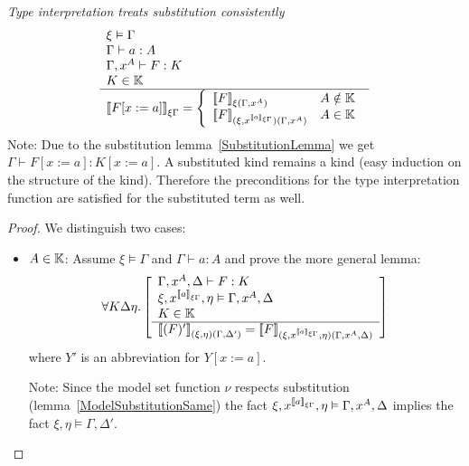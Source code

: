 \begin{theorem}
    \label{TypeInterpretationSubstitution}
    \emph{Type interpretation treats substitution consistently}
    $$
    \rulev{
        \xi \vDash \Gamma
        \\
        \Gamma \vdash a: A
        \\
        \Gamma,x^A \vdash F : K
        \\
        K \in \Kinds
    }
    {
        \typeinter{F[x:=a]}{\xi\Gamma}
        =
        \left\{
        \begin{array}{ll}
            \typeinter{F}{\xi(\Gamma,x^A)}
            &
            A \notin \Kinds
            \\
            \typeinter{F}{(\xi,x^{\typeinter{a}{\xi\Gamma}})(\Gamma,x^A)}
            &
            A \in \Kinds
        \end{array}
        \right.
    }
    $$
    Note: Due to the substitution lemma~\ref{SubstitutionLemma} we get $\Gamma
    \vdash F[x:=a] : K[x:=a]$. A substituted kind remains a kind (easy induction
    on the structure of the kind). Therefore the preconditions for the type
    interpretation function are satisfied for the substituted term as
    well.

    \begin{proof}
        \def\tintera{{\typeinter{a}{\xi\Gamma}}}

        We distinguish two cases:
        \begin{itemize}
        \def\subgoal#1#2#3#4{
            \typeinter{(#1)'}{(\xi,#4)(\Gamma,#3')}
            =
            \typeinter{#1}{(\xi,x^\tintera,#4)(\Gamma,x^A,#3)}
        }
        \def\goal#1#2#3#4{
            \ruleall{#2#3#4}
            {
                \Gamma,x^A,#3 \vdash #1 : #2
                \\
                \xi,x^\tintera,\eta \vDash \Gamma,x^A,#3
                \\
                #2 \in \Kinds
            }
            {
                \subgoal {#1} {#2} {#3} {#4}
            }
        }
        \item $A \in \mathbb{K}$: Assume $\xi \vDash \Gamma$ and $\Gamma \vdash a:
            A$ and prove the more general lemma:
            $$
                \goal F K \Delta \eta
            $$
            where $Y'$ is an abbreviation for $Y[x:=a]$.

            Note: Since the model set function $\nu$ respects substitution
                (lemma~\ref{ModelSubstitutionSame}) the fact
                $\xi,x^\tintera,\eta \vDash \Gamma,x^A,\Delta$ implies the fact
                $\xi,\eta \vDash \Gamma, \Delta'$.


\end{itemize}
\end{proof}
\end{theorem}
